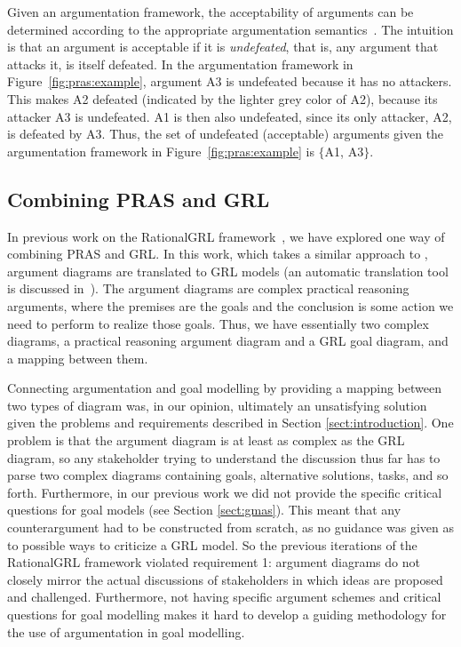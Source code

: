 Given an argumentation framework, the acceptability of arguments can be determined according to the appropriate argumentation semantics~\cite{Dung1995}. The intuition is that an argument is acceptable if it is \emph{undefeated}, that is, any argument that attacks it, is itself defeated. In the argumentation framework in Figure~\ref{fig:pras:example}, argument A3 is undefeated because it has no attackers. This makes A2 defeated (indicated by the lighter grey color of A2), because its attacker A3 is undefeated. A1 is then also undefeated, since its only attacker, A2, is defeated by A3. Thus, the set of undefeated (acceptable) arguments given the argumentation framework in Figure~\ref{fig:pras:example} is $\{$A1, A3$\}$.


\subsection{Combining PRAS and GRL}
\label{sect:background:pras:motivation}

In previous work on the RationalGRL framework~\cite{vanzee-etal:renext2015,vanZee-etal:er2016}, we have explored one way of combining PRAS and GRL. In this work, which takes a similar approach to \cite{Jureta:RE2008}, argument diagrams are translated to GRL models (an automatic translation tool is discussed in~\cite{vanZee-etal:comma2016}). The argument diagrams are complex practical reasoning arguments, where the premises are the goals and the conclusion is some action we need to perform to realize those goals. Thus, we have essentially two complex diagrams, a practical reasoning argument diagram and a GRL goal diagram, and a mapping between them. 

Connecting argumentation and goal modelling by providing a mapping between two types of diagram was, in our opinion, ultimately an unsatisfying solution given the problems and requirements described in Section \ref{sect:introduction}. One problem is that the argument diagram is at least as complex as the GRL diagram, so any stakeholder trying to understand the discussion thus far has to parse two complex diagrams containing goals, alternative solutions, tasks, and so forth. Furthermore, in our previous work we did not provide the specific critical questions for goal models (see Section \ref{sect:gmas}). This meant that any counterargument had to be constructed from scratch, as no guidance was given as to possible ways to criticize a GRL model. So the previous iterations of the RationalGRL framework violated requirement 1: argument diagrams do not closely mirror the actual discussions of stakeholders in which ideas are proposed and challenged. Furthermore, not having specific argument schemes and critical questions for goal modelling makes it hard to develop a guiding methodology for the use of argumentation in goal modelling. 

